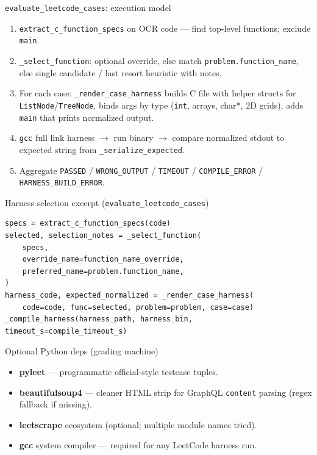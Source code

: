 \documentclass[aspectratio=169]{beamer}
\begin{document}
\begin{frame}{\texttt{evaluate\_leetcode\_cases}: execution model}
  \small
  \begin{enumerate}
    \item \texttt{extract\_c\_function\_specs} on OCR code --- find top-level functions; exclude \texttt{main}.
    \item \texttt{\_select\_function}: optional override, else match \texttt{problem.function\_name}, else single candidate / last resort heuristic with notes.
    \item For each case: \texttt{\_render\_case\_harness} builds C file with helper structs for \texttt{ListNode}/\texttt{TreeNode}, binds args by type (\texttt{int}, arrays, char*, 2D grids), adds \texttt{main} that prints normalized output.
    \item \texttt{gcc} full link harness $\rightarrow$ run binary $\rightarrow$ compare normalized stdout to expected string from \texttt{\_serialize\_expected}.
    \item Aggregate \texttt{PASSED} / \texttt{WRONG\_OUTPUT} / \texttt{TIMEOUT} / \texttt{COMPILE\_ERROR} / \texttt{HARNESS\_BUILD\_ERROR}.
  \end{enumerate}
\end{frame}

\begin{frame}[fragile]{Harness selection excerpt (\texttt{evaluate\_leetcode\_cases})}
\begin{lstlisting}[style=py]
specs = extract_c_function_specs(code)
selected, selection_notes = _select_function(
    specs,
    override_name=function_name_override,
    preferred_name=problem.function_name,
)
harness_code, expected_normalized = _render_case_harness(
    code=code, func=selected, problem=problem, case=case)
_compile_harness(harness_path, harness_bin, timeout_s=compile_timeout_s)
\end{lstlisting}
\end{frame}

\begin{frame}{Optional Python deps (grading machine)}
  \small
  \begin{itemize}
    \item \textbf{pyleet} --- programmatic official-style testcase tuples.
    \item \textbf{beautifulsoup4} --- cleaner HTML strip for GraphQL \texttt{content} parsing (regex fallback if missing).
    \item \textbf{leetscrape} ecosystem (optional; multiple module names tried).
    \item \textbf{gcc} system compiler --- required for any LeetCode harness run.
  \end{itemize}
\end{frame}
\end{document}
